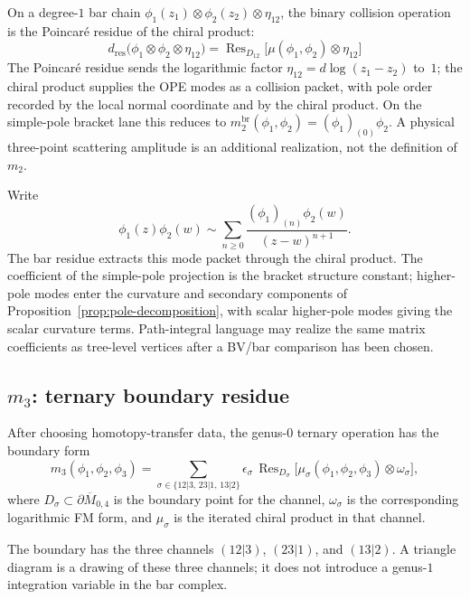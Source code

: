 \begin{example}[Binary product = classical OPE]
\label{ex:m2-tree-level}
On a degree-$1$ bar chain
$\phi_1(z_1)\otimes\phi_2(z_2)\otimes\eta_{12}$, the binary
collision operation is the Poincar\'e residue of the chiral product:
\[
d_{\mathrm{res}}\bigl(\phi_1\otimes\phi_2\otimes\eta_{12}\bigr)
=\operatorname{Res}_{D_{12}}\bigl[\mu(\phi_1,\phi_2)\otimes\eta_{12}\bigr]
\]
The Poincar\'e residue sends the logarithmic factor
$\eta_{12}=d\log(z_1-z_2)$ to~$1$; the chiral product supplies the OPE
modes as a collision packet, with pole order recorded by the local
normal coordinate and by the chiral product.  On the simple-pole
bracket lane this reduces to
$m_2^{\mathrm{br}}(\phi_1,\phi_2)=(\phi_1)_{(0)}\phi_2$.
A physical three-point scattering amplitude is an additional
realization, not the definition of $m_2$.
\end{example}

\begin{remark}\label{rem:witten-m2}
Write
\[
\phi_1(z)\phi_2(w)\sim
\sum_{n\geq 0}\frac{(\phi_1)_{(n)}\phi_2(w)}{(z-w)^{n+1}}.
\]
The bar residue extracts this mode packet through the chiral product.
The coefficient of the simple-pole projection is the bracket
structure constant; higher-pole modes enter the curvature and
secondary components of Proposition~\ref{prop:pole-decomposition},
with scalar higher-pole modes giving the scalar curvature terms.
Path-integral language may realize the same matrix coefficients as
tree-level vertices after a BV/bar comparison has been chosen.
\end{remark}

\subsection{\texorpdfstring{$m_3$: ternary boundary residue}{m 3: ternary boundary residue}}

\begin{example}[Ternary operation = three boundary channels]
\label{ex:m3-one-loop}
After choosing homotopy-transfer data, the genus-$0$ ternary
operation has the boundary form
\[
m_3(\phi_1,\phi_2,\phi_3)
=\sum_{\sigma\in\{12|3,\,23|1,\,13|2\}}
\epsilon_\sigma\,
\operatorname{Res}_{D_\sigma}
\bigl[\mu_\sigma(\phi_1,\phi_2,\phi_3)\otimes\omega_\sigma\bigr],
\]
where $D_\sigma\subset\partial\overline{M}_{0,4}$ is the boundary
point for the channel, $\omega_\sigma$ is the corresponding
logarithmic FM form, and $\mu_\sigma$ is the iterated chiral product
in that channel.

The boundary has the three channels $(12|3)$, $(23|1)$, and
$(13|2)$.  A triangle diagram is a drawing of these three channels; it
does not introduce a genus-$1$ integration variable in the bar complex.
\end{example}

